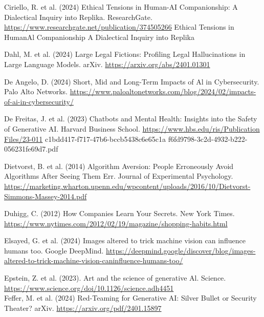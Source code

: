 \documentclass[10pt]{article}
\begin{document}
Ciriello, R. et al. (2024) Ethical Tensions in Human-AI Companionship: A Dialectical Inquiry into Replika. ResearchGate. \href{https://www.researchgate.net/publication/374505266}{https://www.researchgate.net/publication/374505266} Ethical Tensions in HumanAl Companionship A Dialectical Inquiry into Replika

Dahl, M. et al. (2024) Large Legal Fictions: Profiling Legal Hallucinations in Large Language Models. arXiv. \href{https://arxiv.org/abs/2401.01301}{https://arxiv.org/abs/2401.01301}

De Angelo, D. (2024) Short, Mid and Long-Term Impacts of Al in Cybersecurity. Palo Alto Networks. \href{https://www.paloaltonetworks.com/blog/2024/02/impacts-of-ai-in-cybersecurity/}{https://www.paloaltonetworks.com/blog/2024/02/impacts-of-ai-in-cybersecurity/}

De Freitas, J. et al. (2023) Chatbots and Mental Health: Insights into the Safety of Generative AI. Harvard Business School. \href{https://www.hbs.edu/ris/Publication%20Files/23-011}{https://www.hbs.edu/ris/Publication Files/23-011} c1bdd417-f717-47b6-bccb5438c6e65c1a f6fd9798-3c2d-4932-b222-056231fe69d7.pdf

Dietvorst, B. et al. (2014) Algorithm Aversion: People Erroneously Avoid Algorithms After Seeing Them Err. Journal of Experimental Psychology. \href{https://marketing.wharton.upenn.edu/wpcontent/uploads/2016/10/Dietvorst-Simmons-Massey-2014.pdf}{https://marketing.wharton.upenn.edu/wpcontent/uploads/2016/10/Dietvorst-Simmons-Massey-2014.pdf}

Duhigg, C. (2012) How Companies Learn Your Secrets. New York Times. \href{https://www.nytimes.com/2012/02/19/magazine/shopping-habits.html}{https://www.nytimes.com/2012/02/19/magazine/shopping-habits.html}

Elsayed, G. et al. (2024) Images altered to trick machine vision can influence humans too. Google DeepMind. \href{https://deepmind.google/discover/blog/images-altered-to-trick-machine-vision-caninfluence-humans-too/}{https://deepmind.google/discover/blog/images-altered-to-trick-machine-vision-caninfluence-humans-too/}

Epstein, Z. et al. (2023). Art and the science of generative Al. Science.\\
\href{https://www.science.org/doi/10.1126/science.adh4451}{https://www.science.org/doi/10.1126/science.adh4451}\\
Feffer, M. et al. (2024) Red-Teaming for Generative AI: Silver Bullet or Security Theater? arXiv. \href{https://arxiv.org/pdf/2401.15897}{https://arxiv.org/pdf/2401.15897}
\end{document}
